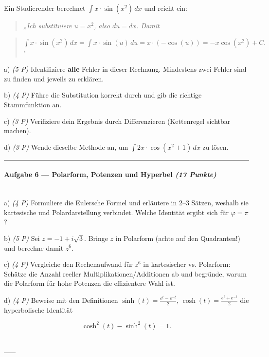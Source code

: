 \documentclass[11pt, a4paper]{article}
\begin{document}
Ein Studierender berechnet $\displaystyle \int x \cdot \sin(x^2)\, dx$ und reicht ein:


\begin{quote}
\textit{„Ich substituiere $u = x^2$, also $du = dx$. Damit}
\end{quote}
\begin{quote}
$\int x\cdot\sin(x^2)\,dx = \int x\cdot\sin(u)\,du = x \cdot (-\cos(u)) = -x\cos(x^2) + C.$"
\end{quote}

a) \textit{(5 P)} Identifiziere \textbf{alle} Fehler in dieser Rechnung. Mindestens zwei Fehler sind zu finden und jeweils zu erklären.


b) \textit{(4 P)} Führe die Substitution korrekt durch und gib die richtige Stammfunktion an.


c) \textit{(3 P)} Verifiziere dein Ergebnis durch Differenzieren (Kettenregel sichtbar machen).


d) \textit{(3 P)} Wende dieselbe Methode an, um $\displaystyle \int 2x\cdot\cos(x^2+1)\, dx$ zu lösen.



\noindent\textcolor{rulegray}{\rule{\linewidth}{0.4pt}}


\paragraph{Aufgabe 6 — Polarform, Potenzen und Hyperbel \textit{(17 Punkte)}}\mbox{}\\[2pt]

a) \textit{(4 P)} Formuliere die Eulersche Formel und erläutere in 2–3 Sätzen, weshalb sie kartesische und Polardarstellung verbindet. Welche Identität ergibt sich für $\varphi = \pi$?


b) \textit{(5 P)} Sei $z = -1 + i\sqrt{3}$. Bringe $z$ in Polarform (achte auf den Quadranten!) und berechne damit $z^6$.


c) \textit{(4 P)} Vergleiche den Rechenaufwand für $z^6$ in kartesischer vs. Polarform: Schätze die Anzahl reeller Multiplikationen/Additionen ab und begründe, warum die Polarform für hohe Potenzen die effizientere Wahl ist.


d) \textit{(4 P)} Beweise mit den Definitionen $\sinh(t) = \tfrac{e^t-e^{-t}}{2}$, $\cosh(t)=\tfrac{e^t+e^{-t}}{2}$ die hyperbolische Identität

\[
\cosh^2(t) - \sinh^2(t) = 1.
\]



\subsection{---}
\end{document}
